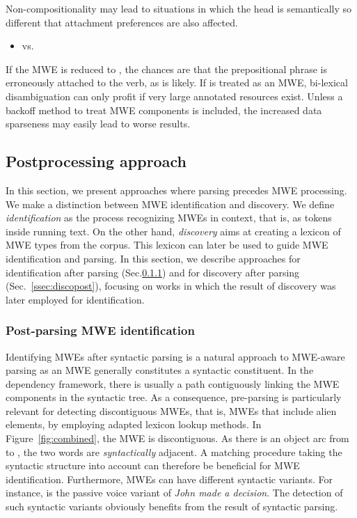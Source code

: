 \documentclass[output=paper]{LSP/langsci}
\begin{document}
Non-compositionality may lead to situations in which the head is semantically so different that attachment preferences are also affected.

\begin{itemize}
\item {} vs. \\
\end{itemize}
If the MWE  is reduced to , the chances are that the prepositional phrase is erroneously attached to the verb, as  is likely. If  is treated as an MWE, bi-lexical disambiguation can only profit if very large annotated resources exist. Unless a backoff method to treat MWE components is included, the increased data sparseness may easily lead to worse results.



\subsection{Postprocessing approach}
\label{ssec:postproc}

In this section, we present approaches where parsing precedes MWE processing. We make a distinction between MWE identification and discovery. We define \emph{identification} as the process recognizing MWEs in context, that is, as tokens inside running text. On the other hand, \emph{discovery} aims at creating a lexicon of MWE types from the corpus. This lexicon can later be used to guide MWE identification and parsing. In this section, we describe approaches for identification after parsing (Sec.\ref{ssec:idpost}) and for discovery after parsing (Sec.~\ref{ssec:discopost}), focusing on works in which the result of discovery was later employed for identification.




\subsubsection{Post-parsing MWE identification}
\label{ssec:idpost}

Identifying MWEs after syntactic parsing is a natural approach to MWE-aware parsing as an MWE generally constitutes a syntactic constituent. In the dependency framework, there is usually a path contiguously linking the MWE components in the syntactic tree. As a consequence, pre-parsing is particularly relevant for detecting discontiguous MWEs, that is, MWEs that include alien elements, by employing adapted lexicon lookup methods. In Figure~\ref{fig:combined}, the MWE  is discontiguous. As there is an object arc from  to , the two words are \emph{syntactically} adjacent. A matching procedure taking the syntactic structure into account can therefore be beneficial for MWE identification. 
Furthermore, MWEs can have different syntactic variants. For instance,  is the passive voice variant of \textit{John made a decision}. The detection of such syntactic variants obviously benefits from the result of syntactic parsing. 
\end{document}
